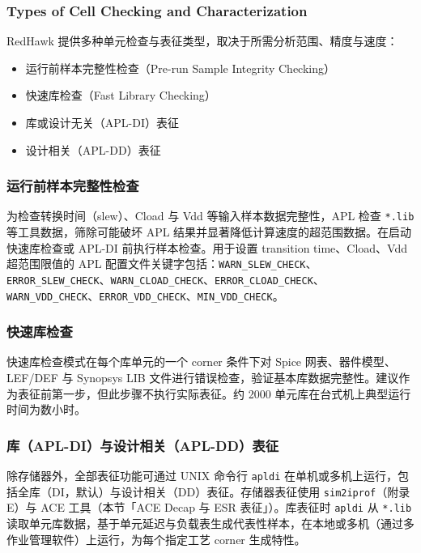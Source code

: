 \subsubsection*{Types of Cell Checking and Characterization}

RedHawk 提供多种单元检查与表征类型，取决于所需分析范围、精度与速度：
\begin{itemize}
  \item 运行前样本完整性检查（Pre-run Sample Integrity Checking）
  \item 快速库检查（Fast Library Checking）
  \item 库或设计无关（APL-DI）表征
  \item 设计相关（APL-DD）表征
\end{itemize}

\subsubsection{运行前样本完整性检查}
为检查转换时间（slew）、Cload 与 Vdd 等输入样本数据完整性，APL 检查 \texttt{*.lib} 等工具数据，筛除可能破坏 APL 结果并显著降低计算速度的超范围数据。在启动快速库检查或 APL-DI 前执行样本检查。用于设置 transition time、Cload、Vdd 超范围限值的 APL 配置文件关键字包括：\texttt{WARN\_SLEW\_CHECK}、\texttt{ERROR\_SLEW\_CHECK}、\texttt{WARN\_CLOAD\_CHECK}、\texttt{ERROR\_CLOAD\_CHECK}、\texttt{WARN\_VDD\_CHECK}、\texttt{ERROR\_VDD\_CHECK}、\texttt{MIN\_VDD\_CHECK}。

\subsubsection{快速库检查}
快速库检查模式在每个库单元的一个 corner 条件下对 Spice 网表、器件模型、LEF/DEF 与 Synopsys LIB 文件进行错误检查，验证基本库数据完整性。建议作为表征前第一步，但此步骤不执行实际表征。约 2000 单元库在台式机上典型运行时间为数小时。

\subsubsection{库（APL-DI）与设计相关（APL-DD）表征}
除存储器外，全部表征功能可通过 UNIX 命令行 \texttt{apldi} 在单机或多机上运行，包括全库（DI，默认）与设计相关（DD）表征。存储器表征使用 \texttt{sim2iprof}（附录 E）与 ACE 工具（本节「ACE Decap 与 ESR 表征」）。库表征时 \texttt{apldi} 从 \texttt{*.lib} 读取单元库数据，基于单元延迟与负载表生成代表性样本，在本地或多机（通过多作业管理软件）上运行，为每个指定工艺 corner 生成特性。

